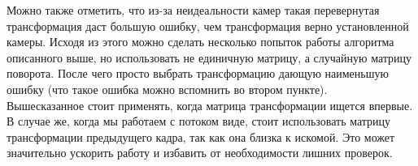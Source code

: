 \documentclass[12pt]{article}
\newenvironment{MyList}[1][4pt]{
  \begin{enumerate}[1.]
  \setlength{\parskip}{0pt}
  \setlength{\itemsep}{#1}
}{       
  \end{enumerate}
}
\begin{document}
\begin{MyList}
		Можно также отметить, что из-за неидеальности камер такая перевернутая трансформация даст большую ошибку, чем трансформация верно установленной камеры. Исходя из этого можно сделать несколько попыток работы алгоритма описанного выше, но использовать не единичную матрицу, а случайную матрицу поворота. После чего просто выбрать трансформацию дающую наименьшую ошибку (что такое ошибка можно вспомнить во втором пункте).\\
		
		Вышесказанное стоит применять, когда матрица трансформации ищется впервые. В случае же, когда мы работаем с потоком виде, стоит использовать матрицу трансформации предыдущего кадра, так как она близка к искомой. Это может значительно ускорить работу и избавить от необходимости лишних проверок.
	\end{MyList}
	
\end{document}
